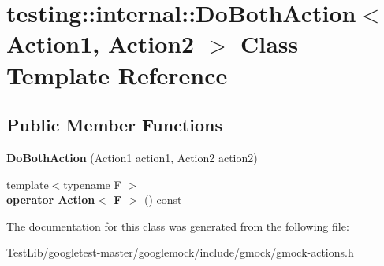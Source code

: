 \hypertarget{classtesting_1_1internal_1_1DoBothAction}{}\section{testing\+:\+:internal\+:\+:Do\+Both\+Action$<$ Action1, Action2 $>$ Class Template Reference}
\label{classtesting_1_1internal_1_1DoBothAction}
\subsection*{Public Member Functions}
\begin{DoxyCompactItemize}
\item 
\mbox{\label{classtesting_1_1internal_1_1DoBothAction_a55727c4dbdc1816ba6f1fe124e96088b}} 
{\bfseries Do\+Both\+Action} (Action1 action1, Action2 action2)
\item 
\mbox{\label{classtesting_1_1internal_1_1DoBothAction_a35733e2f117daad110bfbd3de84634a6}} 
{\footnotesize template$<$typename F $>$ }\\{\bfseries operator Action$<$ F $>$} () const
\end{DoxyCompactItemize}


The documentation for this class was generated from the following file\+:\begin{DoxyCompactItemize}
\item 
Test\+Lib/googletest-\/master/googlemock/include/gmock/gmock-\/actions.\+h\end{DoxyCompactItemize}
